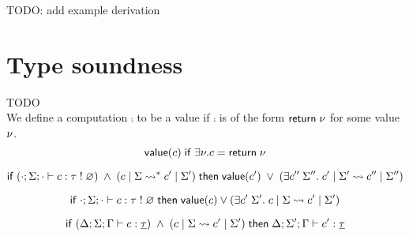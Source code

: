 {TODO: add example derivation

\section{Type soundness}
\label{sec:theorems}

TODO \\
We define a computation $\comp$ to be a value if $\comp$ is of the form $\mathsf{return} \; \nu$ for some value $\nu$.
	\[ \mathsf{value}(c) \;\mathsf{if}\; \exists \nu. c = \mathsf{return} \; \nu \]

\begin{theorem}
\[
	\mathsf{if}\;
		(\cdot;\Sigma;\cdot \vdash c : \tau \; ! \; \varnothing)
		\;\land\;
		(c \;|\; \Sigma \rightsquigarrow^* c' \;|\; \Sigma')
	\;\mathsf{then}\;
		\mathsf{value}(c')
		\;\lor\;
		(\exists c'' \; \Sigma''.\; c' \;|\; \Sigma' \rightsquigarrow c'' \;|\; \Sigma'')
\]
\end{theorem}

\begin{lemma}[Progress]
\[
	\mathsf{if}\;
		\cdot;\Sigma;\cdot \vdash c : \tau \; ! \; \varnothing
	\;\mathsf{then}\;
		\mathsf{value}(c)
		\lor
		(\exists c' \; \Sigma'.\; c \;|\; \Sigma \rightsquigarrow c' \;|\; \Sigma')
\]
\end{lemma}

\begin{lemma}[Preservation]
\[
	\mathsf{if}\;
		(\Delta;\Sigma;\Gamma \vdash c : \underline{\tau})
		\;\land\;
		(c \;|\; \Sigma \rightsquigarrow c' \;|\; \Sigma')
	\;\mathsf{then}\;
		\Delta;\Sigma';\Gamma \vdash c' : \underline{\tau}
\]
\end{lemma}

}
